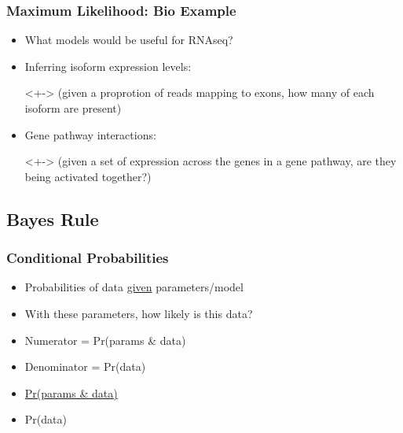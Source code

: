 \documentclass[14pt,handout]{beamer}
\begin{document}
\begin{frame}
\frametitle{Maximum Likelihood: Bio Example}
\begin{itemize}
	\item<+-> What models would be useful for RNAseq?
	\item<+-> Inferring isoform expression levels:
	\item[]<+-> (given a proprotion of reads mapping to exons, how many of each isoform are present)
	\item<+-> Gene pathway interactions:
	\item[]<+-> (given a set of expression across the genes in a gene pathway, are they being activated together?)
\end{itemize}
\end{frame}

\subsection{Bayes Rule}

\begin{frame}
\frametitle{Conditional Probabilities}
\begin{itemize}
	\item<+-> Probabilities of data \underline{given} parameters/model
	\item<+-> With these parameters, how likely is this data?
	\item<+-> Numerator = Pr(params \& data)
	\item<+-> Denominator = Pr(data)
	\item<+->[] \underline{Pr(params \& data)}
	\item<+->[] Pr(data)
\end{itemize}
\end{frame}
\end{document}
